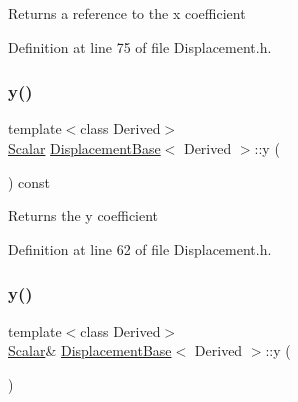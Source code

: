 \begin{DoxyReturn}{Returns}
a reference to the {\ttfamily x} coefficient 
\end{DoxyReturn}


Definition at line 75 of file Displacement.\+h.

\hypertarget{class_displacement_base_ad23b504e3f85c99bd0a293aef8e823bf}{}\label{class_displacement_base_ad23b504e3f85c99bd0a293aef8e823bf} 
\subsubsection{\texorpdfstring{y()}{y()}\hspace{0.1cm}{\footnotesize\ttfamily [1/2]}}
{\footnotesize\ttfamily template$<$class Derived$>$ \\
\hyperlink{class_displacement_base_a978caf313131fd9d221a856a2e4a80ad}{Scalar} \hyperlink{class_displacement_base}{Displacement\+Base}$<$ Derived $>$\+::y (\begin{DoxyParamCaption}{ }\end{DoxyParamCaption}) const\hspace{0.3cm}{\ttfamily [inline]}}

\begin{DoxyReturn}{Returns}
the {\ttfamily y} coefficient 
\end{DoxyReturn}


Definition at line 62 of file Displacement.\+h.

\hypertarget{class_displacement_base_abe7f6f7ce47a153aec93e1b001bc700f}{}\label{class_displacement_base_abe7f6f7ce47a153aec93e1b001bc700f} 
\subsubsection{\texorpdfstring{y()}{y()}\hspace{0.1cm}{\footnotesize\ttfamily [2/2]}}
{\footnotesize\ttfamily template$<$class Derived$>$ \\
\hyperlink{class_displacement_base_a978caf313131fd9d221a856a2e4a80ad}{Scalar}\& \hyperlink{class_displacement_base}{Displacement\+Base}$<$ Derived $>$\+::y (\begin{DoxyParamCaption}{ }\end{DoxyParamCaption})\hspace{0.3cm}{\ttfamily [inline]}}

